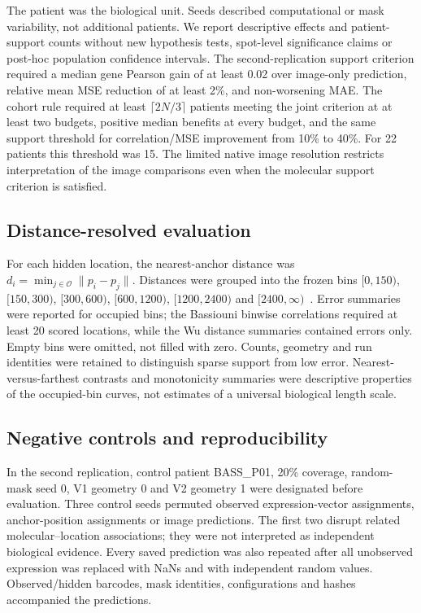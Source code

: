 The patient was the biological unit. Seeds described computational or mask variability, not additional patients. We report descriptive effects and patient-support counts without new hypothesis tests, spot-level significance claims or post-hoc population confidence intervals. The second-replication support criterion required a median gene Pearson gain of at least 0.02 over image-only prediction, relative mean MSE reduction of at least 2\%, and non-worsening MAE. The cohort rule required at least $\lceil2N/3\rceil$ patients meeting the joint criterion at at least two budgets, positive median benefits at every budget, and the same support threshold for correlation/MSE improvement from 10\% to 40\%. For 22 patients this threshold was 15. The limited native image resolution restricts interpretation of the image comparisons even when the molecular support criterion is satisfied.

\subsection{Distance-resolved evaluation}
For each hidden location, the nearest-anchor distance was $d_i=\min_{j\in\mathcal O}\|p_i-p_j\|$. Distances were grouped into the frozen bins $[0,150)$, $[150,300)$, $[300,600)$, $[600,1200)$, $[1200,2400)$ and $[2400,\infty)$~\um{}. Error summaries were reported for occupied bins; the Bassiouni binwise correlations required at least 20 scored locations, while the Wu distance summaries contained errors only. Empty bins were omitted, not filled with zero. Counts, geometry and run identities were retained to distinguish sparse support from low error. Nearest-versus-farthest contrasts and monotonicity summaries were descriptive properties of the occupied-bin curves, not estimates of a universal biological length scale.

\subsection{Negative controls and reproducibility}
In the second replication, control patient BASS\_P01, 20\% coverage, random-mask seed 0, V1 geometry 0 and V2 geometry 1 were designated before evaluation. Three control seeds permuted observed expression-vector assignments, anchor-position assignments or image predictions. The first two disrupt related molecular--location associations; they were not interpreted as independent biological evidence. Every saved prediction was also repeated after all unobserved expression was replaced with NaNs and with independent random values. Observed/hidden barcodes, mask identities, configurations and hashes accompanied the predictions.

